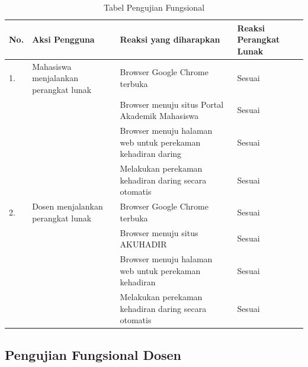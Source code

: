 \begin{table}[H]			
	\caption{Tabel Pengujian Fungsional}
	\centering
	\begin{tabular}{|p{0.5cm} |p{4cm} |p{5.5cm}| p{3cm}|} \hline
		No. & Aksi Pengguna & Reaksi yang diharapkan & Reaksi Perangkat Lunak\\ \hline     
		1. 	& Mahasiswa menjalankan perangkat lunak & Browser Google Chrome terbuka & Sesuai\\ \hline 
	 		& &  Browser menuju situs Portal Akademik Mahasiswa & Sesuai\\ \hline 
			& &  Browser menuju halaman web untuk perekaman kehadiran daring & Sesuai\\ \hline 
			& &  Melakukan perekaman kehadiran daring secara otomatis & Sesuai\\ \hline 
		2. & Dosen menjalankan perangkat lunak & Browser Google Chrome terbuka & Sesuai\\ \hline 
		 	& &  Browser menuju situs AKUHADIR & Sesuai\\ \hline
		 	& &  Browser menuju halaman web untuk perekaman kehadiran & Sesuai\\ \hline
		 	& &  Melakukan perekaman kehadiran daring secara otomatis & Sesuai\\ \hline
	\end{tabular}
	\label{tab:fungsi}
\end{table}

\subsection{Pengujian Fungsional Dosen}

